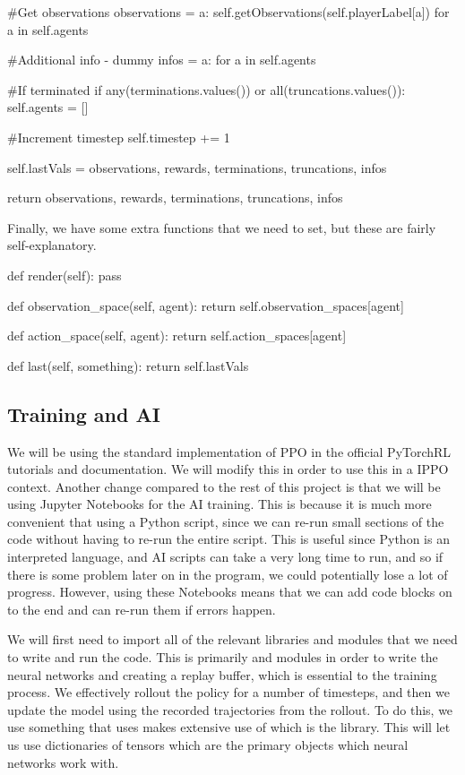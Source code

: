 \begin{mpy}
        #Get observations
        observations = {a: self.getObservations(self.playerLabel[a]) for a in self.agents}

        #Additional info - dummy
        infos = {a: {} for a in self.agents}

        #If terminated
        if any(terminations.values()) or all(truncations.values()):
            self.agents = []

        #Increment timestep
        self.timestep += 1

        self.lastVals = observations, rewards, terminations, truncations, infos

        return observations, rewards, terminations, truncations, infos
\end{mpy}

Finally, we have some extra functions that we need to set, but these are fairly self-explanatory.

\begin{mpy}
    def render(self):
        pass

    def observation_space(self, agent):
        return self.observation_spaces[agent]

    def action_space(self, agent):
        return self.action_spaces[agent]

    def last(self, something):
        return self.lastVals
\end{mpy}


\subsection{Training and AI}

We will be using the standard implementation of PPO in the official PyTorchRL tutorials and documentation. We will modify this in order to use this in a IPPO context. Another change compared to the rest of this project is that we will be using Jupyter Notebooks for the AI training. This is because it is much more convenient that using a Python script, since we can re-run small sections of the code without having to re-run the entire script. This is useful since Python is an interpreted language, and AI scripts can take a very long time to run, and so if there is some problem later on in the program, we could potentially lose a lot of progress. However, using these Notebooks means that we can add code blocks on to the end and can re-run them if errors happen.

\vs

We will first need to import all of the relevant libraries and modules that we need to write and run the code. This is primarily  and  modules in order to write the neural networks and creating a replay buffer, which is essential to the training process. We effectively rollout the policy for a number of timesteps, and then we update the model using the recorded trajectories from the rollout. To do this, we use something that  uses makes extensive use of which is the  library. This will let us use dictionaries of tensors which are the primary objects which neural networks work with.

